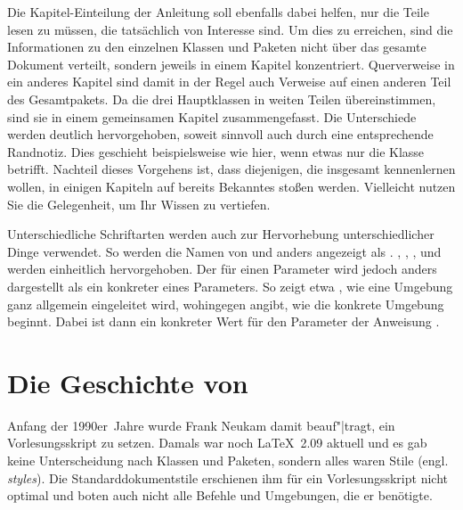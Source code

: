 Die Kapitel-Einteilung der Anleitung soll ebenfalls dabei
helfen, nur die Teile lesen zu müssen, die tatsächlich von Interesse sind. Um
dies zu erreichen, sind die Informationen zu den einzelnen Klassen und Paketen
nicht über das gesamte Dokument verteilt, sondern jeweils in einem Kapitel
konzentriert. Querverweise in ein anderes Kapitel sind damit in der Regel auch
Verweise auf einen anderen Teil des Gesamtpakets. Da die drei Hauptklassen in
weiten Teilen übereinstimmen, sind sie in einem gemeinsamen Kapitel
zusammengefasst. Die Unterschiede werden deutlich hervorgehoben, soweit
sinnvoll auch durch eine entsprechende Randnotiz. Dies geschieht
beispielsweise wie hier, wenn etwas nur die Klasse
 betrifft. Nachteil dieses Vorgehens
ist, dass diejenigen, die \KOMAScript{} insgesamt kennenlernen wollen, in
einigen Kapiteln auf bereits Bekanntes stoßen werden. Vielleicht nutzen Sie
die Gelegenheit, um Ihr Wissen zu vertiefen.

Unterschiedliche Schriftarten werden auch zur Hervorhebung unterschiedlicher
Dinge verwendet. So werden die Namen von  und 
anders angezeigt als . , ,
,  und
 werden einheitlich hervorgehoben. Der
 für einen Parameter wird jedoch anders dargestellt als ein
konkreter  eines Parameters. So zeigt etwa
, wie eine Umgebung ganz allgemein
eingeleitet wird, wohingegen  angibt, wie die
konkrete Umgebung  beginnt. Dabei ist dann
 ein konkreter Wert für den Parameter 
der Anweisung .

\iffalse%
Damit sollten Sie nun alles wissen, um diese Anleitung lesen und verstehen zu
können. Trotzdem könnte es sich lohnen, den Rest dieses Kapitels gelegentlich
auch zu lesen.
\fi


\section{Die Geschichte von \KOMAScript}

  Anfang der 1990er~Jahre wurde Frank Neukam damit beauf"|tragt, ein
  Vorlesungsskript zu setzen. Damals war noch \LaTeX~2.09 aktuell und
  es gab keine Unterscheidung nach Klassen und Paketen, sondern alles
  waren Stile (engl. \emph{styles}). Die Standarddokumentstile
  erschienen ihm für ein Vorlesungsskript nicht optimal und boten auch
  nicht alle Befehle und Umgebungen, die er benötigte.
  
